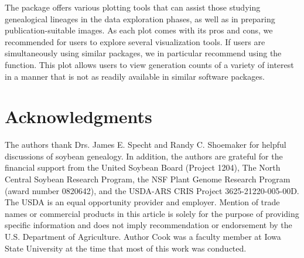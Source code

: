 \documentclass[article,shortnames]{jss}
\begin{document}
The  package offers various plotting tools that can assist those studying genealogical lineages in the data exploration phases, as well as in preparing publication-suitable images. As each plot comes with its pros and cons, we recommended for users to explore several visualization tools. If users are simultaneously using similar packages, we in particular recommend using the  function. This plot allows users to view generation counts of a variety of interest in a manner that is not as readily available in similar software packages.

\clearpage
\section*{Acknowledgments}

The authors thank Drs. James E. Specht and Randy C. Shoemaker for helpful discussions of soybean genealogy. In addition, the authors are grateful for the financial support from the United Soybean Board (Project 1204), The North Central Soybean Research Program, the NSF Plant Genome Research Program (award number 0820642), and the USDA-ARS CRIS Project 3625-21220-005-00D. The USDA is an equal opportunity provider and employer. Mention of trade names or commercial products in this article is solely for the purpose of providing specific information and does not imply recommendation or endorsement by the U.S. Department of Agriculture. Author Cook was a faculty member at Iowa State University at the time that most of this work was conducted.

\clearpage


\end{document}
